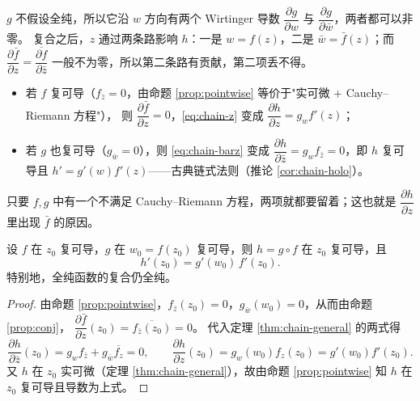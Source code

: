 \begin{remark}\label{rem:bar-term}
$g$ 不假设全纯，所以它沿 $w$ 方向有两个 Wirtinger 导数 $\dfrac{\partial g}{\partial w}$ 与 $\dfrac{\partial g}{\partial\bar w}$，两者都可以非零。
复合之后，$z$ 通过两条路影响 $h$：一是 $w=f(z)$，二是 $\bar w=\bar f(z)$；而
$\dfrac{\partial\bar f}{\partial z}=\overline{\dfrac{\partial f}{\partial\bar z}}$ 一般不为零，所以第二条路有贡献，第二项丢不得。
\begin{itemize}[leftmargin=1.6em]
\item 若 $f$ 复可导（$f_{\bar z}=0$，由命题 \ref{prop:pointwise} 等价于"实可微 $+$ Cauchy--Riemann 方程"），
则 $\dfrac{\partial\bar f}{\partial z}=0$，\eqref{eq:chain-z} 变成 $\dfrac{\partial h}{\partial z}=g_wf'(z)$；
\item 若 $g$ 也复可导（$g_{\bar w}=0$），则 \eqref{eq:chain-barz} 变成
$\dfrac{\partial h}{\partial\bar z}=g_wf_{\bar z}=0$，即 $h$ 复可导且 $h'=g'(w)f'(z)$——古典链式法则（推论 \ref{cor:chain-holo}）。
\end{itemize}
只要 $f,g$ 中有一个不满足 Cauchy--Riemann 方程，两项就都要留着；这也就是 $\dfrac{\partial h}{\partial z}$ 里出现 $\bar f$ 的原因。
\end{remark}

\begin{corollary}\label{cor:chain-holo}
设 $f$ 在 $z_0$ 复可导，$g$ 在 $w_0=f(z_0)$ 复可导，则 $h=g\circ f$ 在 $z_0$ 复可导，且
\[
h'(z_0)=g'(w_0)\,f'(z_0).
\]
特别地，全纯函数的复合仍全纯。
\end{corollary}

\begin{proof}
由命题 \ref{prop:pointwise}，$f_{\bar z}(z_0)=0$，$g_{\bar w}(w_0)=0$，从而由命题 \ref{prop:conj}，
$\dfrac{\partial\bar f}{\partial z}(z_0)=\overline{f_{\bar z}(z_0)}=0$。
代入定理 \ref{thm:chain-general} 的两式得
\[
\frac{\partial h}{\partial \bar z}(z_0)=g_wf_{\bar z}+g_{\bar w}\overline{f_z}=0,
\qquad
\frac{\partial h}{\partial z}(z_0)=g_w(w_0)f_z(z_0)=g'(w_0)f'(z_0).
\]
又 $h$ 在 $z_0$ 实可微（定理 \ref{thm:chain-general}），故由命题 \ref{prop:pointwise} 知 $h$ 在 $z_0$ 复可导且导数为上式。
\end{proof}

